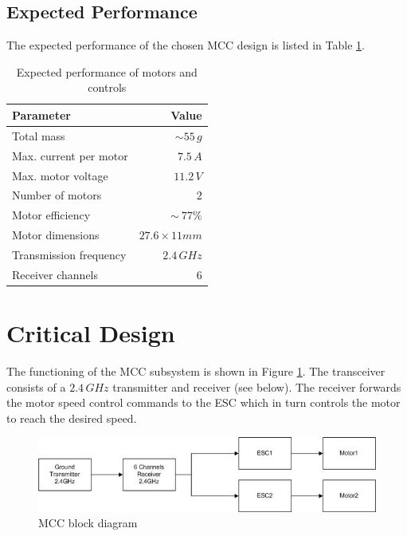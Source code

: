 \subsection{Expected Performance}
The expected performance of the chosen \ac{MCC} design is listed in Table \ref{tab:performance_mcc}.
%
\begin{table}[H]
\centering
\caption{Expected performance of motors and controls}
\label{tab:performance_mcc}
\begin{tabular}{l r}
\hline
\textbf{Parameter} & \textbf{Value}\\ \hline
Total mass & $\sim 55\,g$\\
Max. current per motor & $7.5\,A$ \\
Max. motor voltage & $11.2\,V$ \\
Number of motors & $2$ \\
Motor efficiency & $\sim~77 \%$ \\ 
Motor dimensions & $27.6 \times 11 mm$ \\
Transmission frequency & $2.4\,GHz$\\
Receiver channels & $6$\\
\hline
\end{tabular}
\end{table}
%
%
\section{Critical Design}
%
The functioning of the \ac{MCC} subsystem is shown in Figure \ref{fig:design_block}. The transceiver consists of a $2.4\,GHz$ transmitter and receiver (see below). The receiver forwards the motor speed control commands to the \ac{ESC} which in turn controls the motor to reach the desired speed.
%
\begin{figure}[h]
\centering
\includegraphics[scale=0.8]{figures/blockdiagram.jpg}
\caption{MCC block diagram}
\label{fig:design_block}
\end{figure}
%
